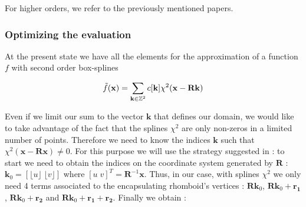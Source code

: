 \documentclass[proc]{edpsmath}
\begin{document}
%

For higher orders, we refer to the previously mentioned papers.

\subsubsection{Optimizing the evaluation}

At the present state we have all the elements for the approximation of a function $f$ with second order box-splines

\begin{equation}
\tilde{f}(\mathbf{x}) = \sum_{\mathbf{k} \in \mathbb{Z}^2} c[\mathbf{k}] \chi^2(\mathbf{x} - \mathbf{R}\mathbf{k})
\end{equation}

Even if we limit our sum to the vector $\mathbf{k}$ that defines our domain, we would like to take advantage of the fact that the splines $\chi^2$ are only non-zeros in a limited number of points. Therefore we need to know the indices $\mathbf{k}$ such that $\chi^2(\mathbf{x} - \mathbf{R} \mathbf{x}) \neq 0$. For this purpose we will use the strategy suggested in \cite{Condat2007} : to start we need to obtain the indices on the coordinate system generated by $\mathbf{R}$ : $\mathbf{k}_0 = \left[ \lfloor u \rfloor \; \lfloor v \rfloor \right]$ where $\left[ u \; v \right]^T = \mathbf{R}^ {-1} \mathbf{x} $. Thus, in our case, with splines $\chi^2$ we only need 4 terms associated to the encapsulating rhomboid's vertices : $\mathbf{R}\mathbf{k}_0$, $\mathbf{R}\mathbf{k}_0 + \mathbf{r_1}$, $\mathbf{R}\mathbf{k}_0 + \mathbf{r_2}$ and $\mathbf{R}\mathbf{k}_0 + \mathbf{r_1} + \mathbf{r_2}$. Finally we obtain :
\end{document}
